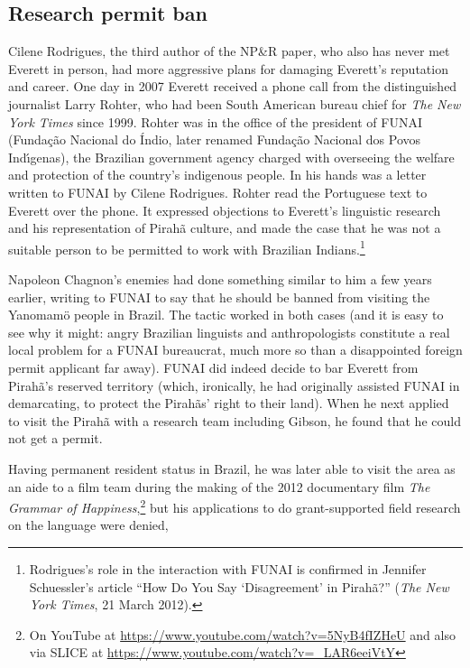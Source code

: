 \documentclass[output=paper,colorlinks,citecolor=brown
]{langscibook}
\begin{document}
\subsection{Research permit ban}

Cilene Rodrigues, the third author of the NP\&R paper, who also has never
met Everett in person, had more aggressive plans for damaging Everett's
reputation and career. One day in 2007 Everett received a phone call
from the distinguished journalist Larry Rohter, who had been South
American bureau chief for \textit{The New York Times} since 1999.
Rohter was in the office of the president of FUNAI (Funda{\c{c}}{\~a}o
Nacional do {\'I}ndio, later renamed Funda{\c{c}}{\~a}o Nacional dos
Povos Ind{\'\i}genas), the Brazilian government agency charged with
overseeing the welfare and protection of the country's indigenous
people. In his hands was a letter written to FUNAI by Cilene Rodrigues.
Rohter read the Portuguese text to Everett over the phone. It expressed
objections to Everett's linguistic research and his representation
of Pirah{\~a} culture, and made the case that he was not a suitable
person to be permitted to work with Brazilian Indians.\footnote{%
   Rodrigues's role in the interaction with FUNAI is confirmed in
   Jennifer Schuessler's article ``How Do You Say `Disagreement' in
   Pirah{\~a}?'' (\textit{The New York Times}, 21 March 2012).}

Napoleon Chagnon's enemies had done something similar to him a few
years earlier, writing to FUNAI to say that he should be banned from
visiting the Yanomam{\"o} people in Brazil. The tactic worked in both
cases (and it is easy to see why it might: angry Brazilian linguists and
anthropologists constitute a real local problem for a FUNAI bureaucrat,
much more so than a disappointed foreign permit applicant far away).
FUNAI did indeed decide to bar Everett from Pirah{\~a}'s reserved
territory (which, ironically, he had originally assisted FUNAI in
demarcating, to protect the Pirah{\~a}s' right to their land). When
he next applied to visit the Pirah{\~a} with a research team including
Gibson, he found that he could not get a permit.

Having permanent resident status in Brazil, he was later able to visit the
area as an aide to a film team during the making of the 2012 documentary
film \textit{The Grammar of Happiness},\footnote{%
   On YouTube at \url{https://www.youtube.com/watch?v=5NyB4fIZHeU} and
   also via SLICE at \url{https://www.youtube.com/watch?v=_LAR6eeiVtY}}
but his applications to do grant-supported field research on the language
were denied,
\end{document}

